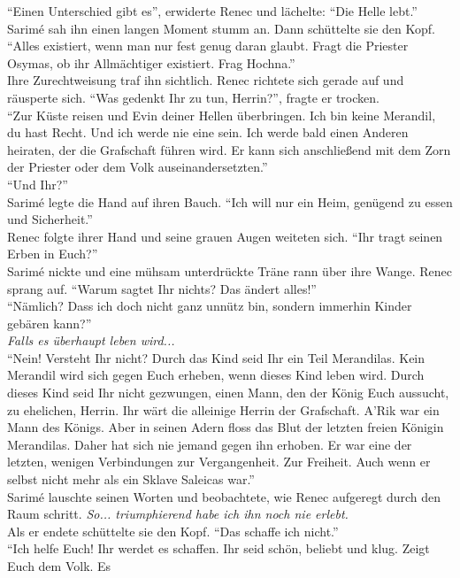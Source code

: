 ``Einen Unterschied gibt es'', erwiderte Renec und lächelte: ``Die Helle lebt.''\\
Sarimé sah ihn einen langen Moment stumm an. Dann schüttelte sie den Kopf. ``Alles existiert, wenn 
man nur fest genug daran glaubt. Fragt die Priester Osymas, ob ihr Allmächtiger existiert. Frag 
Hochna.''\\
Ihre Zurechtweisung traf ihn sichtlich. Renec richtete sich gerade auf und räusperte sich. ``Was 
gedenkt Ihr zu tun, Herrin?'', fragte er trocken.\\
``Zur Küste reisen und Evin deiner Hellen überbringen. Ich bin keine Merandil, du hast Recht. Und 
ich werde nie eine sein. Ich werde bald einen Anderen heiraten, der die Grafschaft führen wird. Er 
kann sich anschließend mit dem Zorn der Priester oder dem Volk auseinandersetzten.''\\
``Und Ihr?''\\
Sarimé legte die Hand auf ihren Bauch. ``Ich will nur ein Heim, genügend zu essen und 
Sicherheit.''\\
Renec folgte ihrer Hand und seine grauen Augen weiteten sich. ``Ihr tragt seinen Erben in Euch?''\\
Sarimé nickte und eine mühsam unterdrückte Träne rann über ihre Wange. Renec sprang auf. ``Warum 
sagtet Ihr nichts? Das ändert alles!''\\
``Nämlich? Dass ich doch nicht ganz unnütz bin, sondern immerhin Kinder gebären kann?''\\
\textit{Falls es überhaupt leben wird...}\\
``Nein! Versteht Ihr nicht? Durch das Kind seid Ihr ein Teil Merandilas. Kein Merandil wird sich 
gegen Euch erheben, wenn dieses Kind leben wird. Durch dieses Kind seid Ihr nicht gezwungen, einen 
Mann, den der König Euch aussucht, zu ehelichen, Herrin. Ihr wärt die alleinige Herrin der 
Grafschaft. A'Rik war ein Mann des Königs. Aber in seinen Adern floss das Blut der letzten freien 
Königin Merandilas. Daher hat sich nie jemand gegen ihn erhoben. Er war eine der letzten, wenigen 
Verbindungen zur Vergangenheit. Zur Freiheit. Auch wenn er selbst nicht mehr als ein Sklave 
Saleicas war.''\\
Sarimé lauschte seinen Worten und beobachtete, wie Renec aufgeregt durch den Raum schritt. 
\textit{So... triumphierend habe ich ihn noch nie erlebt.}\\
Als er endete schüttelte sie den Kopf. ``Das schaffe ich nicht.''\\
``Ich helfe Euch! Ihr werdet es schaffen. Ihr seid schön, beliebt und klug. Zeigt Euch dem Volk. Es 
